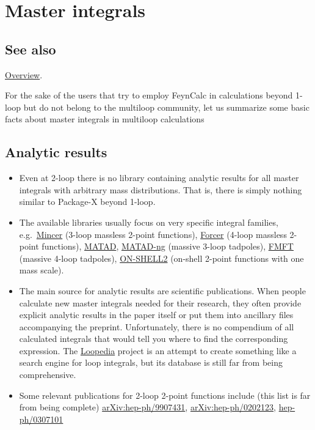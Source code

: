 \documentclass[../FeynCalcManual.tex]{subfiles}
\begin{document}
\hypertarget{master integrals}{
\section{Master integrals}\label{master integrals}}

\subsection{See also}

\hyperlink{toc}{Overview}.

For the sake of the users that try to employ FeynCalc in calculations
beyond 1-loop but do not belong to the multiloop community, let us
summarize some basic facts about master integrals in multiloop
calculations

\subsection{Analytic results}\label{analytic-results}

\begin{itemize}
\item
  Even at 2-loop there is no library containing analytic results for all
  master integrals with arbitrary mass distributions. That is, there is
  simply nothing similar to Package-X beyond 1-loop.
\item
  The available libraries usually focus on very specific integral
  families,
  e.g.~\href{https://www.nikhef.nl/~form/maindir/packages/mincer/mincer.html}{Mincer}
  (3-loop massless 2-point functions),
  \href{https://github.com/benruijl/forcer}{Forcer} (4-loop massless
  2-point functions),
  \href{https://www.ttp.kit.edu/~ms/software.html}{MATAD},
  \href{https://github.com/apik/matad-ng}{MATAD-ng} (massive 3-loop
  tadpoles), \href{https://github.com/apik/fmft}{FMFT} (massive 4-loop
  tadpoles),
  \href{http://theor.jinr.ru/~kalmykov/onshell2/onshell2.html}{ON-SHELL2}
  (on-shell 2-point functions with one mass scale).
\item
  The main source for analytic results are scientific publications. When
  people calculate new master integrals needed for their research, they
  often provide explicit analytic results in the paper itself or put
  them into ancillary files accompanying the preprint. Unfortunately,
  there is no compendium of all calculated integrals that would tell you
  where to find the corresponding expression. The
  \href{https://arxiv.org/abs/1709.01266}{Loopedia} project is an
  attempt to create something like a search engine for loop integrals,
  but its database is still far from being comprehensive.
\item
  Some relevant publications for 2-loop 2-point functions include (this
  list is far from being complete)
  \href{https://arxiv.org/abs/hep-ph/9907431}{arXiv:hep-ph/9907431},
  \href{https://arxiv.org/abs/hep-ph/0202123v2}{arXiv:hep-ph/0202123},
  \href{https://arxiv.org/abs/hep-ph/0307101v1}{hep-ph/0307101}
\end{itemize}
\end{document}
